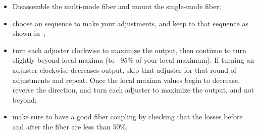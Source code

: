 \begin{itemize}
  \item Disassemble the multi-mode fiber and mount the single-mode fiber;
  \item choose an sequence to make your adjustments, and keep to that sequence as shown in~;
  \item turn each adjuster clockwise to maximize the output, then continue to turn slightly beyond local maxima (to ~95\% of your local maximum). If turning an adjuster clockwise decreases output, skip that adjuster for that round of adjustments and repeat. Once the local maxima values begin to decrease, reverse the direction, and turn each adjuster to maximize the output, and not beyond;
  \item make sure to have a good fiber coupling by checking that the losses before and after the fiber are less than 50\%.
\end{itemize}
